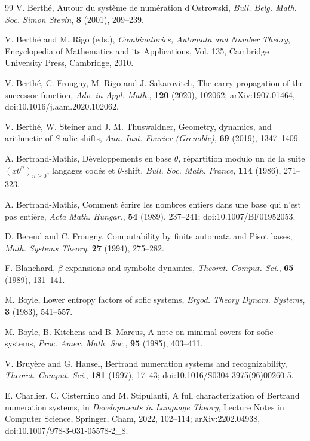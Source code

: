 \begin{thebibliography}{99}
V. Berth\'e, Autour du syst\`eme de num\'eration d'Ostrowski, \textit{Bull. Belg. Math. Soc. Simon Stevin}, \textbf{8} (2001), 209--239.

V. Berth\'e and M. Rigo (eds.), \textit{Combinatorics, Automata and Number Theory}, Encyclopedia of Mathematics and its Applications, Vol. 135, Cambridge University Press, Cambridge, 2010.

V. Berth\'e, C. Frougny, M. Rigo and J. Sakarovitch,
The carry propagation of the successor function,
\textit{Adv. in Appl. Math.}, \textbf{120} (2020), 102062;
arXiv:1907.01464, doi:10.1016/j.aam.2020.102062.

V. Berth\'e, W. Steiner and J. M. Thuswaldner, Geometry, dynamics, and arithmetic of $S$-adic shifts, \textit{Ann. Inst. Fourier (Grenoble)}, \textbf{69} (2019), 1347--1409.

A. Bertrand-Mathis, D\'eveloppements en base $\theta$, r\'epartition modulo un
de la suite $(x\theta^n)_{n\ge0}$, langages cod\'es et $\theta$-shift,
\textit{Bull. Soc. Math. France}, \textbf{114} (1986), 271--323.

A. Bertrand-Mathis, Comment \'ecrire les nombres entiers dans une base qui
n'est pas enti\`ere,
\textit{Acta Math. Hungar.}, \textbf{54} (1989), 237--241;
doi:10.1007/BF01952053.

D. Berend and C. Frougny, Computability by finite automata and Pisot bases,
\textit{Math. Systems Theory}, \textbf{27} (1994), 275--282.

F. Blanchard, $\beta$-expansions and symbolic dynamics,
\textit{Theoret. Comput. Sci.}, \textbf{65} (1989), 131--141.

M. Boyle, Lower entropy factors of sofic systems, \textit{Ergod. Theory Dynam. Systems}, \textbf{3} (1983), 541--557.

M. Boyle, B. Kitchens and B. Marcus, A note on minimal covers for sofic systems, \textit{Proc. Amer. Math. Soc.}, \textbf{95} (1985), 403--411.

V. Bruy\`ere and G. Hansel, Bertrand numeration systems and recognizability,
\textit{Theoret. Comput. Sci.}, \textbf{181} (1997), 17--43;
doi:10.1016/S0304-3975(96)00260-5.

E. Charlier, C. Cisternino and M. Stipulanti,
A full characterization of Bertrand numeration systems,
in \textit{Developments in Language Theory}, Lecture Notes in Computer
Science, Springer, Cham, 2022, 102--114;
arXiv:2202.04938, doi:10.1007/978-3-031-05578-2\_8.


\end{thebibliography}

